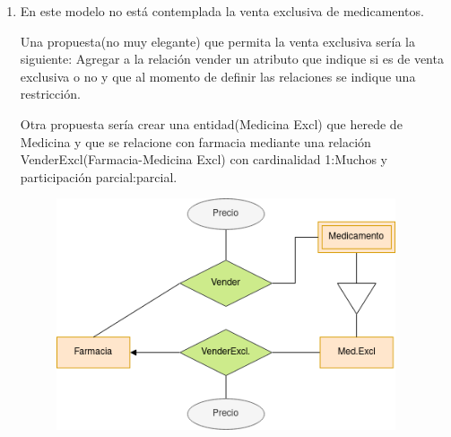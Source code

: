 \documentclass{exam}
\begin{document}
\begin{questions}
\begin{enumerate}[label=\alph*]
	    \item En este modelo no está contemplada la venta exclusiva de medicamentos. 
	    
	    Una propuesta(no muy elegante) que permita la venta exclusiva sería la siguiente: Agregar a la relación vender un atributo que indique si es de venta exclusiva o no y que al momento de definir las relaciones se indique una restricción.
	    
	    Otra propuesta sería crear una entidad(Medicina Excl) que herede de Medicina y que se relacione con farmacia mediante una relación VenderExcl(Farmacia-Medicina Excl) con cardinalidad 1:Muchos y participación parcial:parcial.
	    
	    \begin{figure}[h!]
	        \centering
	        \includegraphics[width=10cm]{imgCardenas/tarea2-4-d.png}
	    \end{figure}
	\end{enumerate}
	
\end{questions}
\end{document}
